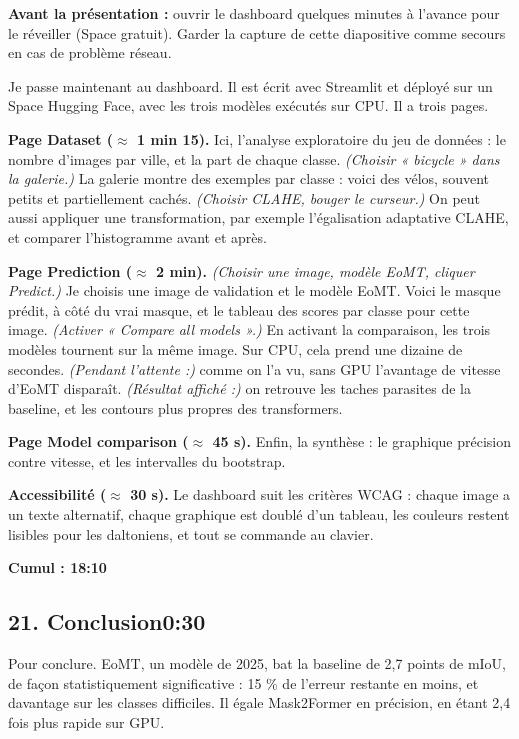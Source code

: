 \documentclass[11pt,a4paper]{article}
\newcommand{\didascalie}[1]{{\color{bodyc}\itshape #1}}
\newcommand{\cumul}[1]{\par{\hfill\small\color{accent}\bfseries #1}\par}
\newcommand{\tempo}[1]{\hfill{\normalsize\color{accent}#1}}
\begin{document}
\textbf{Avant la présentation :} ouvrir le dashboard quelques minutes à l'avance pour le réveiller (Space gratuit). Garder la capture de cette diapositive comme secours en cas de problème réseau.

Je passe maintenant au dashboard. Il est écrit avec Streamlit et déployé sur un Space Hugging Face, avec les trois modèles exécutés sur CPU. Il a trois pages.

\textbf{Page Dataset ($\approx$ 1 min 15).}
Ici, l'analyse exploratoire du jeu de données : le nombre d'images par ville, et la part de chaque classe. \didascalie{(Choisir « bicycle » dans la galerie.)} La galerie montre des exemples par classe : voici des vélos, souvent petits et partiellement cachés. \didascalie{(Choisir CLAHE, bouger le curseur.)} On peut aussi appliquer une transformation, par exemple l'égalisation adaptative CLAHE, et comparer l'histogramme avant et après.

\textbf{Page Prediction ($\approx$ 2 min).}
\didascalie{(Choisir une image, modèle EoMT, cliquer Predict.)} Je choisis une image de validation et le modèle EoMT. Voici le masque prédit, à côté du vrai masque, et le tableau des scores par classe pour cette image. \didascalie{(Activer « Compare all models ».)} En activant la comparaison, les trois modèles tournent sur la même image. Sur CPU, cela prend une dizaine de secondes. \didascalie{(Pendant l'attente :)} comme on l'a vu, sans GPU l'avantage de vitesse d'EoMT disparaît. \didascalie{(Résultat affiché :)} on retrouve les taches parasites de la baseline, et les contours plus propres des transformers.

\textbf{Page Model comparison ($\approx$ 45 s).}
Enfin, la synthèse : le graphique précision contre vitesse, et les intervalles du bootstrap.

\textbf{Accessibilité ($\approx$ 30 s).}
Le dashboard suit les critères WCAG : chaque image a un texte alternatif, chaque graphique est doublé d'un tableau, les couleurs restent lisibles pour les daltoniens, et tout se commande au clavier.

\cumul{Cumul : 18:10}

\subsection*{21. Conclusion\tempo{0:30}}

Pour conclure. EoMT, un modèle de 2025, bat la baseline de 2,7 points de mIoU, de façon statistiquement significative : 15 \% de l'erreur restante en moins, et davantage sur les classes difficiles. Il égale Mask2Former en précision, en étant 2,4 fois plus rapide sur GPU.
\end{document}

